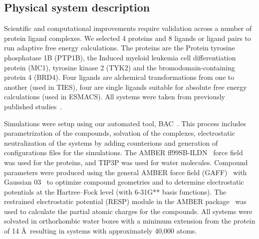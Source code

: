 \subsection{Physical system description}

Scientific and computational improvements require validation across a number
of protein ligand complexes. We selected 4 proteins and 8 ligands or ligand
pairs to run adaptive free energy calculations. The proteins are the Protein
tyrosine phosphatase 1B (PTP1B), the Induced myeloid leukemia cell
differentiation protein (MC1), tyrosine kinase 2 (TYK2) and the
bromodomain-containing protein 4 (BRD4). Four ligands are alchemical
transformations from one to another (used in TIES), four are single ligands
suitable for absolute free energy calculations (used in ESMACS). All systems
were taken from previously published studies~\cite{Bhati2017}.

Simulations were setup using our automated tool, BAC~\cite{Sadiq2008}. This
process includes parametrization of the compounds, solvation of the
complexes, electrostatic neutralization of the systems by adding counterions
and generation of configurations files for the simulations. The AMBER
ff99SB-ILDN~\cite{Lindorff-Larsen2010} force field was used for the proteins,
and TIP3P was used for water molecules. Compound parameters were produced
using the general AMBER force field (GAFF)~\cite{Wang2004} with Gaussian
03~\cite{Frisch} to optimize compound geometries and to determine
electrostatic potentials at the Hartree–Fock level (with 6-31G** basis
functions). The restrained electrostatic potential (RESP) module in the AMBER
package~\cite{Case2005} was used to calculate the partial atomic charges for
the compounds. All systems were solvated in orthorhombic water boxes with a
minimum extension from the protein of 14 \AA\, resulting in systems with
approximately 40,000 atoms.

